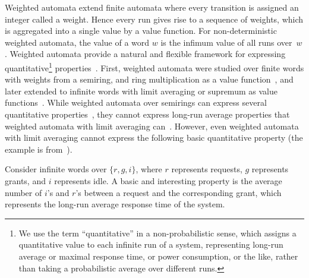\documentclass{lmcs}
\begin{document}
\smallskip{}
Weighted automata extend finite automata where every transition is
assigned an integer called a weight.
Hence every run gives rise to a sequence of weights, which is
aggregated into a single value by a value function.
For non-deterministic weighted automata, the value of a word
$w$ is the infimum value of all runs over~$w$.
Weighted automata provide a natural and flexible framework for
expressing quantitative\footnote{We use the term ``quantitative'' in a
non-probabilistic sense, which assigns a quantitative value to each
infinite run of a system, representing long-run average or maximal
response time, or power consumption, or the like, rather than taking a
probabilistic average over different runs.}
properties~\cite{Chatterjee08quantitativelanguages}.
First, weighted automata were studied over finite words with weights
from a semiring, and ring multiplication as a value function~\cite{Droste:2009:HWA:1667106},
and later extended to infinite words with limit averaging or supremum as
value functions~\cite{Chatterjee08quantitativelanguages,DBLP:journals/corr/abs-1007-4018,Chatterjee:2009:AWA:1789494.1789497}.
While weighted automata over semirings can express several
quantitative properties~\cite{DBLP:journals/jalc/Mohri02}, they cannot
express long-run average properties that weighted automata with limit
averaging can~\cite{Chatterjee08quantitativelanguages}.
However, even weighted automata with limit averaging cannot express
the following basic quantitative property (the example is from~\cite{nested}).


\begin{exa}\label{ex:intro}
Consider infinite words over $\{r,g,i\}$, where $r$ represents
requests, $g$ represents grants, and $i$ represents idle. A
basic and interesting property is the average number of $i$'s and $r$'s
between a request and the corresponding grant, which represents the
long-run average response time of the system.
\end{exa}
\end{document}

